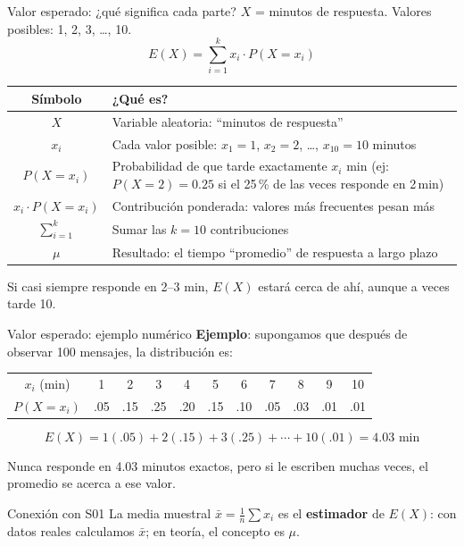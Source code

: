 \documentclass[aspectratio=169, 11pt]{beamer}
\begin{document}
\begin{frame}{Valor esperado: ¿qu\'e significa cada parte?}
\small
$X$ = minutos de respuesta. Valores posibles: 1, 2, 3, \ldots, 10.
\[
E(X) = \sum_{i=1}^{k} x_i \cdot P(X = x_i)
\]

\begin{table}
\centering
\begin{tabular}{cp{}}
\toprule
\textbf{S\'imbolo} & \textbf{¿Qu\'e es?} \\
\midrule
$X$ & Variable aleatoria: ``minutos de respuesta'' \\
$x_i$ & Cada valor posible: $x_1\!=\!1$, $x_2\!=\!2$, \ldots, $x_{10}\!=\!10$ minutos \\
$P(X\!=\!x_i)$ & Probabilidad de que tarde exactamente $x_i$ min (ej: $P(X\!=\!2) = 0.25$ si el 25\,\% de las veces responde en 2\,min) \\
$x_i \!\cdot\! P(X\!=\!x_i)$ & Contribuci\'on ponderada: valores m\'as frecuentes pesan m\'as \\
$\displaystyle\sum_{i=1}^{k}$ & Sumar las $k=10$ contribuciones \\
$\mu$ & Resultado: el tiempo ``promedio'' de respuesta a largo plazo \\
\bottomrule
\end{tabular}
\end{table}

\alert{Si casi siempre responde en 2--3 min, $E(X)$ estar\'a cerca de ah\'i, aunque a veces tarde 10.}
\end{frame}

\begin{frame}{Valor esperado: ejemplo num\'erico}
\textbf{Ejemplo}: supongamos que despu\'es de observar 100 mensajes, la distribuci\'on es:

\vspace{0.3em}
\small
\centering
\begin{tabular}{ccccccccccc}
\toprule
$x_i$ (min) & 1 & 2 & 3 & 4 & 5 & 6 & 7 & 8 & 9 & 10 \\
$P(X\!=\!x_i)$ & .05 & .15 & .25 & .20 & .15 & .10 & .05 & .03 & .01 & .01 \\
\bottomrule
\end{tabular}

\raggedright
\vspace{0.5em}
\[
E(X) = 1(.05) + 2(.15) + 3(.25) + \cdots + 10(.01) = 4.03 \text{ min}
\]

Nunca responde en 4.03 minutos exactos, pero si le escriben muchas veces, el promedio se acerca a ese valor.

\begin{exampleblock}{Conexión con S01}
La media muestral $\bar{x} = \frac{1}{n}\sum x_i$ es el \textbf{estimador} de $E(X)$: con datos reales calculamos $\bar{x}$; en teor\'ia, el concepto es $\mu$.
\end{exampleblock}
\end{frame}
\end{document}
